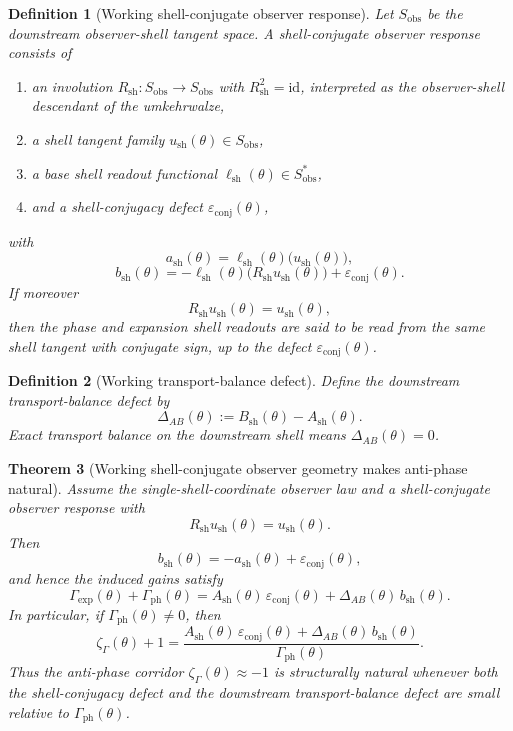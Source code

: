 \documentclass[12pt,a4paper]{article}
\newtheorem{theorem}{Theorem}[section]
\newtheorem{definition}[theorem]{Definition}
\begin{document}
\begin{definition}[Working shell-conjugate observer response]
Let $S_{\mathrm{obs}}$ be the downstream observer-shell tangent space. A \emph{shell-conjugate observer response} consists of
\begin{enumerate}[leftmargin=2em,label=(\roman*)]
\item an involution $R_{\mathrm{sh}}:S_{\mathrm{obs}}\to S_{\mathrm{obs}}$ with $R_{\mathrm{sh}}^2=\mathrm{id}$, interpreted as the observer-shell descendant of the umkehrwalze,
\item a shell tangent family $u_{\mathrm{sh}}(\theta)\in S_{\mathrm{obs}}$,
\item a base shell readout functional $\ell_{\mathrm{sh}}(\theta)\in S_{\mathrm{obs}}^*$,
\item and a shell-conjugacy defect $\varepsilon_{\mathrm{conj}}(\theta)$,
\end{enumerate}
with
\[
 a_{\mathrm{sh}}(\theta)=\ell_{\mathrm{sh}}(\theta)\bigl(u_{\mathrm{sh}}(\theta)\bigr),
\]
\[
 b_{\mathrm{sh}}(\theta)=-\ell_{\mathrm{sh}}(\theta)\bigl(R_{\mathrm{sh}}u_{\mathrm{sh}}(\theta)\bigr)+\varepsilon_{\mathrm{conj}}(\theta).
\]
If moreover
\[
 R_{\mathrm{sh}}u_{\mathrm{sh}}(\theta)=u_{\mathrm{sh}}(\theta),
\]
then the phase and expansion shell readouts are said to be read from the same shell tangent with conjugate sign, up to the defect $\varepsilon_{\mathrm{conj}}(\theta)$.
\end{definition}

\begin{definition}[Working transport-balance defect]
Define the downstream transport-balance defect by
\[
 \Delta_{AB}(\theta):=B_{\mathrm{sh}}(\theta)-A_{\mathrm{sh}}(\theta).
\]
Exact transport balance on the downstream shell means $\Delta_{AB}(\theta)=0$.
\end{definition}

\begin{theorem}[Working shell-conjugate observer geometry makes anti-phase natural]
Assume the single-shell-coordinate observer law and a shell-conjugate observer response with
\[
 R_{\mathrm{sh}}u_{\mathrm{sh}}(\theta)=u_{\mathrm{sh}}(\theta).
\]
Then
\[
 b_{\mathrm{sh}}(\theta)=-a_{\mathrm{sh}}(\theta)+\varepsilon_{\mathrm{conj}}(\theta),
\]
and hence the induced gains satisfy
\[
 \Gamma_{\mathrm{exp}}(\theta)+\Gamma_{\mathrm{ph}}(\theta)
 =A_{\mathrm{sh}}(\theta)\,\varepsilon_{\mathrm{conj}}(\theta)
 +\Delta_{AB}(\theta)\,b_{\mathrm{sh}}(\theta).
\]
In particular, if $\Gamma_{\mathrm{ph}}(\theta)\neq 0$, then
\[
 \zeta_{\Gamma}(\theta)+1
 =
 \frac{A_{\mathrm{sh}}(\theta)\,\varepsilon_{\mathrm{conj}}(\theta)
 +\Delta_{AB}(\theta)\,b_{\mathrm{sh}}(\theta)}{\Gamma_{\mathrm{ph}}(\theta)}.
\]
Thus the anti-phase corridor $\zeta_{\Gamma}(\theta)\approx -1$ is structurally natural whenever both the shell-conjugacy defect and the downstream transport-balance defect are small relative to $\Gamma_{\mathrm{ph}}(\theta)$.
\end{theorem}
\end{document}
